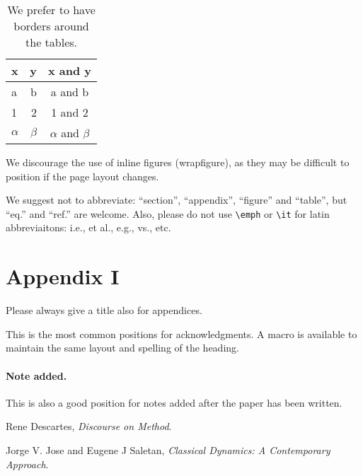 \documentclass[a4paper,11pt]{article}
\theoremstyle{definition}
\begin{document}
\begin{table}[tbp]
\centering
\begin{tabular}{|lr|c|}
\hline
x&y&x and y\\
\hline 
a & b & a and b\\
1 & 2 & 1 and 2\\
$\alpha$ & $\beta$ & $\alpha$ and $\beta$\\
\hline
\end{tabular}
\caption{\label{tab:i} We prefer to have borders around the tables.}
\end{table}

We discourage the use of inline figures (wrapfigure), as they may be
difficult to position if the page layout changes.

We suggest not to abbreviate: ``section'', ``appendix'', ``figure''
and ``table'', but ``eq.'' and ``ref.'' are welcome. Also, please do
not use \texttt{\textbackslash emph} or \texttt{\textbackslash it} for
latin abbreviaitons: i.e., et al., e.g., vs., etc.

\appendix
\section{Appendix I}
Please always give a title also for appendices.



\acknowledgments

This is the most common positions for acknowledgments. A macro is
available to maintain the same layout and spelling of the heading.

\paragraph{Note added.} This is also a good position for notes added
after the paper has been written.







\fi

\begin{thebibliography}{99}

Rene Descartes, \emph{Discourse on Method}.

Jorge V. Jose and Eugene J Saletan, \emph{Classical Dynamics: A Contemporary Approach}.

\end{thebibliography}
\end{document}

